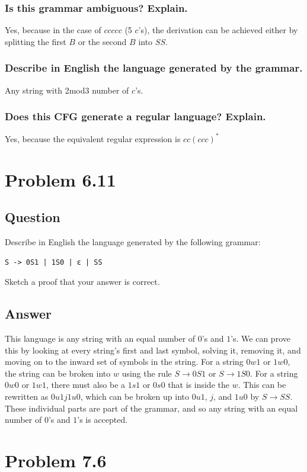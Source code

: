 \documentclass[12pt, a4paper]{article}
\begin{document}
\subsubsection{Is this grammar ambiguous? Explain.}
Yes, because in the case of $ccccc$ (5 $c$'s), the derivation can be achieved either by splitting the first $B$ or the second $B$ into $SS$.
\subsubsection{Describe in English the language generated by the grammar.}
Any string with 2mod3 number of $c$'s.
\subsubsection{Does this CFG generate a regular language? Explain.}
Yes, because the equivalent regular expression is $cc(ccc)^{*}$

\section{Problem 6.11}
\subsection{Question}
Describe in English the language generated by the following grammar:
\begin{lstlisting}
S -> 0S1 | 1S0 | ε | SS
\end{lstlisting}
Sketch a proof that your answer is correct.
\subsection{Answer}
This language is any string with an equal number of $0$'s and $1$'s.\newline
\newline
We can prove this by looking at every string's first and last symbol, solving it, removing it, and moving on to the inward set of symbols in the string.\newline
For a string $0w1$ or $1w0$, the string can be broken into $w$ using the rule $S \to 0S1$ or $S \to 1S0$. For a string $0w0$ or $1w1$, there must also be a $1s1$ or $0s0$ that is inside the $w$. This can be rewritten as $0u1j1u0$, which can be broken up into $0u1$, $j$, and $1u0$ by $S \to SS$. These individual parts are part of the grammar, and so any string with an equal number of $0$'s and $1$'s is accepted.

\section{Problem 7.6}
\end{document}
